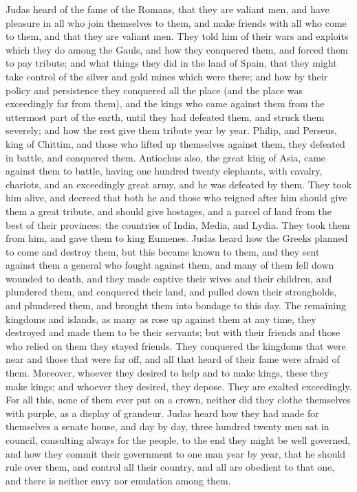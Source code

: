  Judas heard of the fame of the Romans, that they are
valiant men, and have pleasure in all who join themselves to them, and
make friends with all who come to them,  and that they are
valiant men. They told him of their wars and exploits which they do
among the Gauls, and how they conquered them, and forced them to pay
tribute;  and what things they did in the land of Spain,
that they might take control of the silver and gold mines which were
there;  and how by their policy and persistence they
conquered all the place (and the place was exceedingly far from them),
and the kings who came against them from the uttermost part of the
earth, until they had defeated them, and struck them severely; and how
the rest give them tribute year by year.  Philip, and
Perseus, king of Chittim, and those who lifted up themselves against
them, they defeated in battle, and conquered them. 
Antiochus also, the great king of Asia, came against them to battle,
having one hundred twenty elephants, with cavalry, chariots, and an
exceedingly great army, and he was defeated by them.  They
took him alive, and decreed that both he and those who reigned after him
should give them a great tribute, and should give hostages, and a parcel
of land from the best of their provinces:  the countries of
India, Media, and Lydia. They took them from him, and gave them to king
Eumenes.  Judas heard how the Greeks planned to come and
destroy them,  but this became known to them, and they sent
against them a general who fought against them, and many of them fell
down wounded to death, and they made captive their wives and their
children, and plundered them, and conquered their land, and pulled down
their strongholds, and plundered them, and brought them into bondage to
this day.  The remaining kingdoms and islands, as many as
rose up against them at any time, they destroyed and made them to be
their servants;  but with their friends and those who
relied on them they stayed friends. They conquered the kingdoms that
were near and those that were far off, and all that heard of their fame
were afraid of them.  Moreover, whoever they desired to
help and to make kings, these they make kings; and whoever they desired,
they depose. They are exalted exceedingly.  For all this,
none of them ever put on a crown, neither did they clothe themselves
with purple, as a display of grandeur.  Judas heard how
they had made for themselves a senate house, and day by day, three
hundred twenty men sat in council, consulting always for the people, to
the end they might be well governed,  and how they commit
their government to one man year by year, that he should rule over them,
and control all their country, and all are obedient to that one, and
there is neither envy nor emulation among them.

